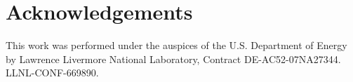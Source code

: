 \section*{Acknowledgements}

This work was performed under the auspices of the U.S. Department of
Energy by Lawrence Livermore National Laboratory, Contract
DE-AC52-07NA27344.  LLNL-CONF-669890.
